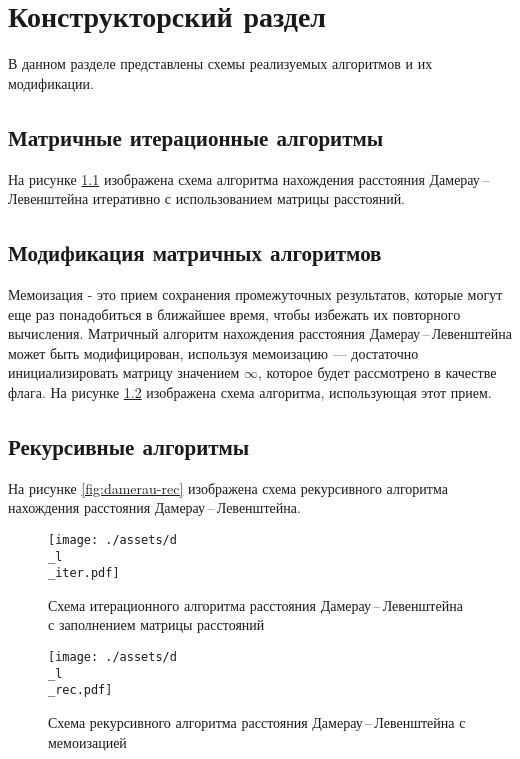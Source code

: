 \chapter{Конструкторский раздел}
В данном разделе представлены схемы реализуемых алгоритмов и их модификации.
\section{Матричные итерационные алгоритмы}
На рисунке \ref{fig:damerau-Page-1} изображена схема алгоритма нахождения расстояния Дамерау\,--\,Левенштейна итеративно  с использованием матрицы расстояний.
\section{Модификация матричных алгоритмов}
Мемоизация - это прием сохранения промежуточных результатов, которые могут еще раз понадобиться в ближайшее время, чтобы избежать их повторного вычисления. 
Матричный алгоритм нахождения расстояния Дамерау\,--\,Левенштейна может быть модифицирован, используя мемоизацию --- достаточно инициализировать матрицу значением $\infty$, которое будет рассмотрено в качестве флага.
На рисунке \ref{fig:damerau-mem} изображена схема алгоритма, использующая этот прием.
\section{Рекурсивные алгоритмы}
На рисунке \ref{fig:damerau-rec} изображена схема рекурсивного алгоритма  нахождения расстояния Дамерау\,--\,Левенштейна.
\newpage 


\begin{figure}[!ht]
	\begin{center}
		\texttt{[image: ./assets/d\\\_l\\\_iter.pdf]}
	\end{center}
	
	\caption{Схема итерационного алгоритма расстояния Дамерау\,--\,Левенштейна с заполнением матрицы расстояний}
	\label{fig:damerau-Page-1}
\end{figure}

\begin{figure}[!ht]
	\begin{center}
		\texttt{[image: ./assets/d\\\_l\\\_rec.pdf]}
	\end{center}
	
	\caption{Схема рекурсивного алгоритма расстояния Дамерау\,--\,Левенштейна с мемоизацией}
	\label{fig:damerau-mem}
\end{figure}

